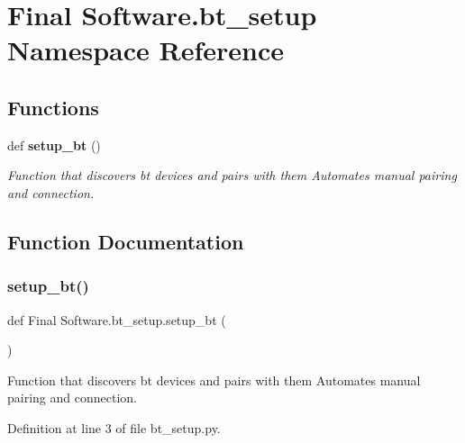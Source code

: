 \section{Final Software.\+bt\+\_\+setup Namespace Reference}
\label{namespace_final_01_software_1_1bt__setup}
\subsection*{Functions}
\begin{DoxyCompactItemize}
\item 
def \textbf{ setup\+\_\+bt} ()
\begin{DoxyCompactList}\small\item\em Function that discovers bt devices and pairs with them Automates manual pairing and connection. \end{DoxyCompactList}\end{DoxyCompactItemize}


\subsection{Function Documentation}
\mbox{\label{namespace_final_01_software_1_1bt__setup_a632c708d6bd7762526a49799611b26be}} 
\subsubsection{setup\_bt()}
{\footnotesize\ttfamily def Final Software.\+bt\+\_\+setup.\+setup\+\_\+bt (\begin{DoxyParamCaption}{ }\end{DoxyParamCaption})}



Function that discovers bt devices and pairs with them Automates manual pairing and connection. 



Definition at line 3 of file bt\+\_\+setup.\+py.

